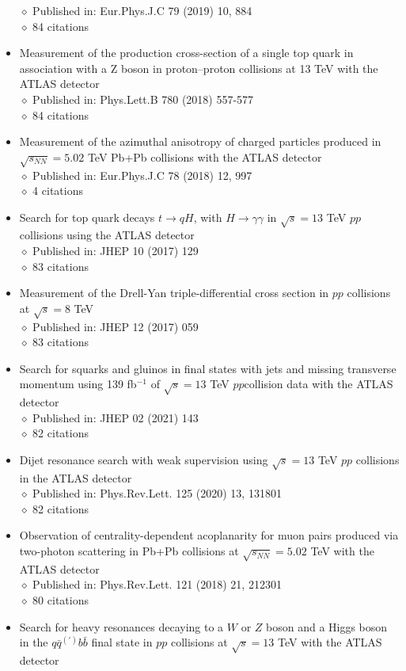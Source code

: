 \documentclass[margin, 10pt]{res} %
\begin{document}
\begin{resume}
\begin{itemize}
$\diamond$ Published in: Eur.Phys.J.C 79 (2019) 10, 884\\
$\diamond$ 84 citations
\item Measurement of the production cross-section of a single top quark in association with a Z boson in proton–proton collisions at 13 TeV with the ATLAS detector\\
$\diamond$ Published in: Phys.Lett.B 780 (2018) 557-577\\
$\diamond$ 84 citations
\item Measurement of the azimuthal anisotropy of charged particles produced in $\sqrt{s_{NN}} = 5.02$ TeV Pb+Pb collisions with the ATLAS detector\\
$\diamond$ Published in: Eur.Phys.J.C 78 (2018) 12, 997\\
$\diamond$ 4 citations
\item Search for top quark decays $t \rightarrow qH$, with $H \rightarrow \gamma\gamma$ in $\sqrt{s} = 13$ TeV $pp$ collisions using the ATLAS detector\\
$\diamond$ Published in: JHEP 10 (2017) 129\\
$\diamond$ 83 citations
\item Measurement of the Drell-Yan triple-differential cross section in $pp$ collisions at $\sqrt{s} = 8$ TeV\\
$\diamond$ Published in: JHEP 12 (2017) 059\\
$\diamond$ 83 citations
\item Search for squarks and gluinos in final states with jets and missing transverse momentum using 139 fb$^{-1}$ of $\sqrt{s} = 13$ TeV $pp$collision data with the ATLAS detector\\
$\diamond$ Published in: JHEP 02 (2021) 143\\
$\diamond$ 82 citations
\item Dijet resonance search with weak supervision using $\sqrt{s} = 13$ TeV $pp$ collisions in the ATLAS detector\\
$\diamond$ Published in: Phys.Rev.Lett. 125 (2020) 13, 131801\\
$\diamond$ 82 citations
\item Observation of centrality-dependent acoplanarity for muon pairs produced via two-photon scattering in Pb+Pb collisions at $\sqrt{s_{NN}} = 5.02$ TeV with the ATLAS detector\\
$\diamond$ Published in: Phys.Rev.Lett. 121 (2018) 21, 212301\\
$\diamond$ 80 citations
\item Search for heavy resonances decaying to a $W$ or $Z$ boson and a Higgs boson in the $q\bar{q}^{(')}b\bar{b}$ final state in $pp$ collisions at $\sqrt{s} = 13$ TeV with the ATLAS detector\\

\end{itemize}
\end{resume}
\end{document}

